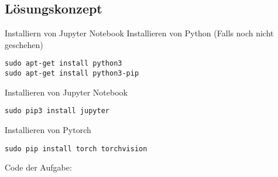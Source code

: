 \documentclass[a4paper,11pt,titlepage]{article}
\begin{document}
\subsection{L\"osungskonzept}
Installiern von Jupyter Notebook \newline
Installieren von Python (Falls noch nicht geschehen) \newline
\begin{lstlisting}[style=console]
sudo apt-get install python3
sudo apt-get install python3-pip
\end{lstlisting}
Installieren von Jupyter Notebook \newline
\begin{lstlisting}[style=console]
sudo pip3 install jupyter
\end{lstlisting}
Installieren von Pytorch
\begin{lstlisting}[style=console]
sudo pip install torch torchvision
\end{lstlisting}
Code der Aufgabe:
\end{document}
